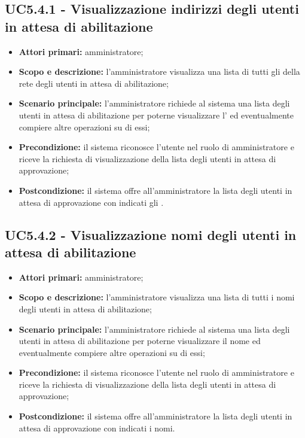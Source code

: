 \documentclass[AnalisiDeiRequisiti.tex]{subfiles}
\begin{document}
\subsection{UC5.4.1 - Visualizzazione indirizzi degli utenti in attesa di abilitazione}
\begin{itemize}
	\item \textbf{Attori primari:} amministratore;
	\item \textbf{Scopo e descrizione:} l'amministratore visualizza una lista di tutti gli  della rete  degli utenti in attesa di abilitazione;
	\item \textbf{Scenario principale:} l'amministratore richiede al sistema una lista degli utenti in attesa di abilitazione per poterne visualizzare l' ed eventualmente compiere altre operazioni su di essi;
	\item \textbf{Precondizione:} il sistema riconosce l'utente nel ruolo di amministratore e riceve la richiesta di visualizzazione della lista degli utenti in attesa di approvazione;
	\item \textbf{Postcondizione:} il sistema offre all'amministratore la lista degli utenti in attesa di approvazione con indicati gli .
\end{itemize}
\subsection{UC5.4.2 - Visualizzazione nomi degli utenti in attesa di abilitazione}
\begin{itemize}
	\item \textbf{Attori primari:} amministratore;
	\item \textbf{Scopo e descrizione:} l'amministratore visualizza una lista di tutti i nomi degli utenti in attesa di abilitazione;
	\item \textbf{Scenario principale:} l'amministratore richiede al sistema una lista degli utenti in attesa di abilitazione per poterne visualizzare il nome ed eventualmente compiere altre operazioni su di essi;
	\item \textbf{Precondizione:} il sistema riconosce l'utente nel ruolo di amministratore e riceve la richiesta di visualizzazione della lista degli utenti in attesa di approvazione;
	\item \textbf{Postcondizione:} il sistema offre all'amministratore la lista degli utenti in attesa di approvazione con indicati i nomi.
\end{itemize}
\end{document}
